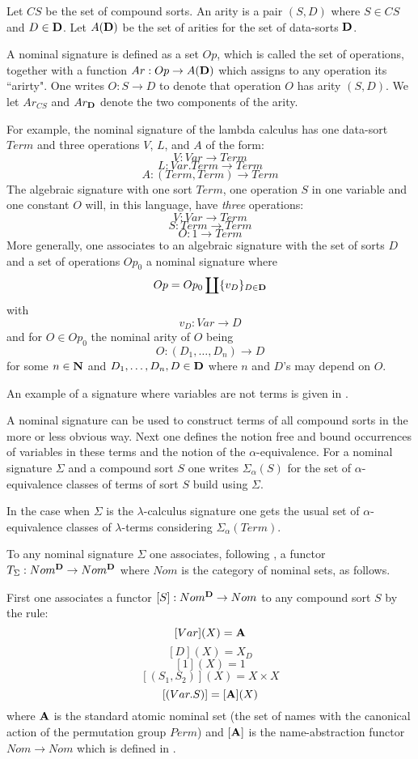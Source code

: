 \documentclass[11pt]{article}
\newcommand{\sr}{\rightarrow}
\newcommand{\nn}{{\bf N\rm}}
\newcommand{\nat}{\nn}
\begin{document}
{ Let $CS$ be the set of compound sorts. An arity is a pair $(S,D)$ where $S\in CS$ and $D\in {\bf D}$. Let $A({\bf D})$ be the set of arities for the set of data-sorts $\bf D$. 

A nominal signature is defined as a set $Op$, which is called the set of operations, together with a function  $Ar:Op\sr A({\bf D})$ which assigns to any operation its ``arirty". One writes $O:S\sr D$ to denote that operation $O$ has arity $(S,D)$. We let $Ar_{CS}$ and $Ar_{\bf D}$ denote the two components of the arity. 

For example, the nominal signature of the lambda calculus has one data-sort $Term$ and three operations $V$, $L$, and $A$  of the form:
%
$$V:Var\sr Term$$
$$L:Var.Term\sr Term$$
$$A:(Term,Term)\sr Term$$
%
The algebraic signature with one sort $Term$, one operation $S$ in one variable and one constant $O$ will, in this language, have {\em three}  operations:
%
$$V:Var\sr Term$$
$$S: Term\sr Term$$
$$O:1\sr Term$$
%
More generally, one associates to an algebraic signature with the set of sorts $D$ and a set of operations $Op_0$ a nominal signature where 
%
$$Op=Op_0\coprod\{v_D\}_{D\in {\bf D}}$$
%
with 
%
$$v_D:Var\sr D$$
%
and for $O\in Op_0$ the nominal arity of $O$ being
%
$$O:(D_1,\dots,D_n)\sr D$$
%
for some $n\in\nat$ and $D_1,\dots,D_n,D\in {\bf D}$ where $n$ and $D$'s may depend on $O$.  

An example of a signature where variables are not terms is given in \cite{Pitts}. 

A nominal signature can be used to construct terms of all compound sorts in the more or less obvious way. Next one defines the notion free and bound occurrences of variables in these terms and the notion of the  $\alpha$-equivalence. For a nominal signature $\Sigma$ and a compound sort $S$ one writes $\Sigma_{\alpha}(S)$ for the set of $\alpha$-equivalence classes of terms of sort $S$ build using $\Sigma$.

In the case when $\Sigma$ is the $\lambda$-calculus signature one gets the usual set of $\alpha$-equivalence classes of $\lambda$-terms considering $\Sigma_{\alpha}(Term)$. 

To any nominal signature $\Sigma$ one associates, following \cite{Pitts}, a functor $T_{\Sigma}:Nom^{\bf D}\sr Nom^{\bf D}$ where $Nom$ is the category of nominal sets, as follows.

First one associates a functor $[S]:Nom^{\bf D}\sr Nom$ to any compound sort $S$ by the rule:
%
$$[Var](X)={\bf A}$$
$$[D](X)=X_D$$
$$[1](X)=1$$
$$[(S_1,S_2)](X)=X\times X$$
$$[(Var.S)]=[{\bf A}](X)$$
%
where ${\bf A}$ is the standard atomic nominal set (the set of names with the canonical action of the permutation group $Perm$) and $[{\bf A}]$ is the name-abstraction functor $Nom\sr Nom$ which is defined in \cite[Section 4]{Pitts}. 

}
\end{document}
